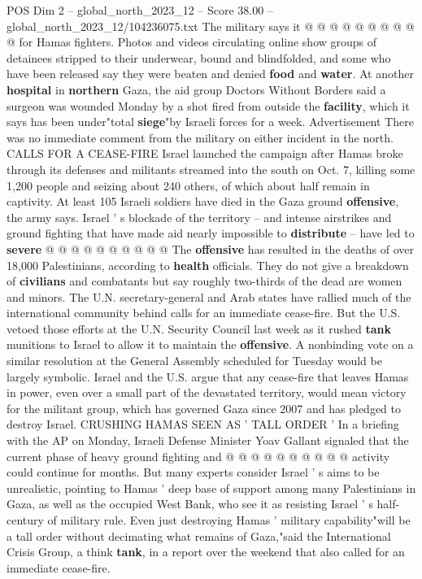 \begin{textsample}{POS Dim 2 – global\_north\_2023\_12 – Score 38.00 – global\_north\_2023\_12/104236075.txt}
The military says it @ @ @ @ @ @ @ @ @ @ for Hamas fighters.
Photos and videos circulating online show groups of detainees stripped to their underwear, bound and blindfolded, and some who have been released say they were beaten and denied \textbf{food} and \textbf{water}.
At another \textbf{hospital} in \textbf{northern} Gaza, the aid group Doctors Without Borders said a surgeon was wounded Monday by a shot fired from outside the \textbf{facility}, which it says has been under"total \textbf{siege}"by Israeli forces for a week.
Advertisement There was no immediate comment from the military on either incident in the north.
CALLS FOR A CEASE-FIRE Israel launched the campaign after Hamas broke through its defenses and militants streamed into the south on Oct. 7, killing some 1,200 people and seizing about 240 others, of which about half remain in captivity.
At least 105 Israeli soldiers have died in the Gaza ground \textbf{offensive}, the army says.
Israel ' s blockade of the territory -- and intense airstrikes and ground fighting that have made aid nearly impossible to \textbf{distribute} -- have led to \textbf{severe} @ @ @ @ @ @ @ @ @ @ The \textbf{offensive} has resulted in the deaths of over 18,000 Palestinians, according to \textbf{health} officials.
They do not give a breakdown of \textbf{civilians} and combatants but say roughly two-thirds of the dead are women and minors.
The U.N. secretary-general and Arab states have rallied much of the international community behind calls for an immediate cease-fire.
But the U.S. vetoed those efforts at the U.N.
Security Council last week as it rushed \textbf{tank} munitions to Israel to allow it to maintain the \textbf{offensive}.
A nonbinding vote on a similar resolution at the General Assembly scheduled for Tuesday would be largely symbolic.
Israel and the U.S. argue that any cease-fire that leaves Hamas in power, even over a small part of the devastated territory, would mean victory for the militant group, which has governed Gaza since 2007 and has pledged to destroy Israel.
CRUSHING HAMAS SEEN AS ' TALL ORDER ' In a briefing with the AP on Monday, Israeli Defense Minister Yoav Gallant signaled that the current phase of heavy ground fighting and @ @ @ @ @ @ @ @ @ @ activity could continue for months.
But many experts consider Israel ' s aims to be unrealistic, pointing to Hamas ' deep base of support among many Palestinians in Gaza, as well as the occupied West Bank, who see it as resisting Israel ' s half-century of military rule.
Even just destroying Hamas ' military capability"will be a tall order without decimating what remains of Gaza,"said the International Crisis Group, a think \textbf{tank}, in a report over the weekend that also called for an immediate cease-fire.

\end{textsample}

